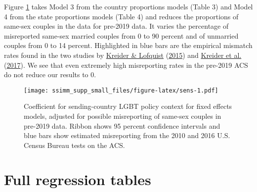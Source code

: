 \documentclass[
  11pt,
]{article}
\begin{document}
Figure \ref{fig:sens} takes Model 3 from the country proportions models (Table 3) and Model 4 from the state proportions models (Table 4) and reduces the proportions of same-sex couples in the data for pre-2019 data. It varies the percentage of misreported same-sex married couples from 0 to 90 percent and of unmarried couples from 0 to 14 percent. Highlighted in blue bars are the empirical mismatch rates found in the two studies by \protect\hyperlink{ref-kreider_2015}{Kreider \& Lofquist} (\protect\hyperlink{ref-kreider_2015}{2015}) and \protect\hyperlink{ref-kreider_2017}{Kreider et al.} (\protect\hyperlink{ref-kreider_2017}{2017}). We see that even extremely high misreporting rates in the pre-2019 ACS do not reduce our results to 0.

\begin{figure}
\centering
\texttt{[image: ssimm\_supp\_small\_files/figure-latex/sens-1.pdf]}
\caption{\label{fig:sens}Coefficient for sending-country LGBT policy context for fixed effects models, adjusted for possible misreporting of same-sex couples in pre-2019 data. Ribbon shows 95 percent confidence intervals and blue bars show estimated misreporting from the 2010 and 2016 U.S. Census Bureau tests on the ACS.}
\end{figure}

\hypertarget{full-regression-tables}{%
\section{Full regression tables}\label{full-regression-tables}}
\end{document}
